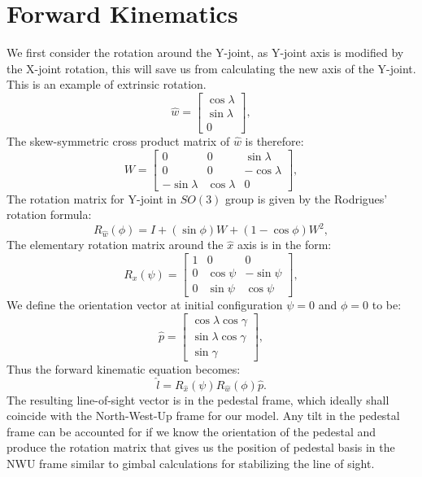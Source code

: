 \documentclass[a4paper,twocolumn,10pt]{article}
\begin{document}
\section*{Forward Kinematics}
We first consider the rotation around the Y-joint, as Y-joint axis is
modified by the X-joint rotation, this will save us from calculating
the new axis of the Y-joint. This is an example of extrinsic rotation.
\begin{equation}
    \hat w = \begin{bmatrix}
            \cos\lambda \\
            \sin\lambda \\
            0
        \end{bmatrix},
\end{equation}
The skew-symmetric cross product matrix of $\hat w$ is therefore:
\begin{equation}
    W = \begin{bmatrix}
        0 & 0 & \sin\lambda \\
        0 & 0 & -\cos\lambda \\
        -\sin\lambda & \cos\lambda & 0
    \end{bmatrix},
\end{equation}
The rotation matrix for Y-joint in $SO(3)$ group is given by the Rodrigues'
rotation formula:
\begin{equation}
    R_{\hat w}(\phi) = I + (\sin \phi) W + (1 - \cos \phi) W^2,
\end{equation}
The elementary rotation matrix around the $\hat x$ axis is in the form:
\begin{equation}
    R_x ( \psi ) = \begin{bmatrix}
        1 & 0 & 0 \\
        0 & \cos \psi & -\sin \psi \\
        0 & \sin \psi & \cos \psi
    \end{bmatrix},
\end{equation}
We define the orientation vector at initial configuration $\psi = 0$ and $\phi
= 0$ to
be:
\begin{equation}
    \hat p =
    \begin{bmatrix}
        \cos \lambda \cos \gamma\\
        \sin \lambda \cos \gamma\\
        \sin \gamma
    \end{bmatrix},
\end{equation}
Thus the forward kinematic equation becomes:
\begin{equation}
    \hat l = R_{\hat x} ( \psi ) R_{\hat w} ( \phi ) \hat p.
\end{equation}
The resulting line-of-sight vector is in the pedestal frame, which ideally
shall coincide with the North-West-Up frame for our model. Any tilt in the
pedestal frame can be accounted for if we know the orientation of the pedestal
and produce the rotation matrix that gives us the position of pedestal basis
in the NWU frame similar to gimbal calculations for stabilizing the line of 
sight\cite{kaan2018}.
\newpage
\end{document}
